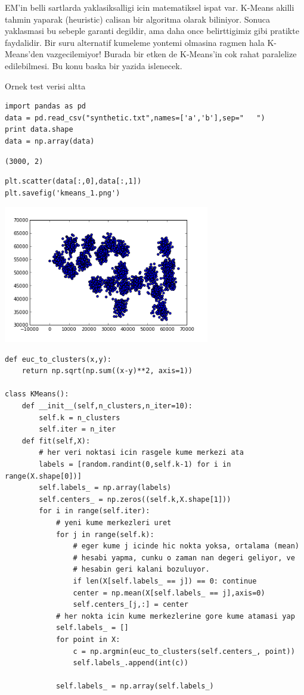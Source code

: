 \documentclass[12pt,fleqn]{article}\usepackage{../common}
\begin{document}
EM'in belli sartlarda yaklasiksalligi icin matematiksel ispat
var. K-Means akilli tahmin yaparak (heuristic) calisan bir algoritma
olarak biliniyor. Sonuca yaklasmasi bu sebeple garanti degildir, ama
daha once belirttigimiz gibi pratikte faydalidir. Bir suru alternatif
kumeleme yontemi olmasina ragmen hala K-Means'den vazgecilemiyor!
Burada bir etken de K-Means'in cok rahat paralelize edilebilmesi. Bu
konu baska bir yazida islenecek.

Ornek test verisi altta

\begin{verbatim}
import pandas as pd
data = pd.read_csv("synthetic.txt",names=['a','b'],sep="   ")
print data.shape
data = np.array(data)
\end{verbatim}

\begin{verbatim}
(3000, 2)
\end{verbatim}

\begin{verbatim}
plt.scatter(data[:,0],data[:,1])
plt.savefig('kmeans_1.png')
\end{verbatim}

\includegraphics[height=6cm]{kmeans_1.png}
\begin{verbatim}
def euc_to_clusters(x,y):
    return np.sqrt(np.sum((x-y)**2, axis=1))

class KMeans():
    def __init__(self,n_clusters,n_iter=10):
        self.k = n_clusters
        self.iter = n_iter
    def fit(self,X):
        # her veri noktasi icin rasgele kume merkezi ata
        labels = [random.randint(0,self.k-1) for i in range(X.shape[0])]
        self.labels_ = np.array(labels)
        self.centers_ = np.zeros((self.k,X.shape[1]))
        for i in range(self.iter):
            # yeni kume merkezleri uret
            for j in range(self.k):
                # eger kume j icinde hic nokta yoksa, ortalama (mean)
                # hesabi yapma, cunku o zaman nan degeri geliyor, ve
                # hesabin geri kalani bozuluyor.
                if len(X[self.labels_ == j]) == 0: continue
                center = np.mean(X[self.labels_ == j],axis=0)
                self.centers_[j,:] = center
            # her nokta icin kume merkezlerine gore kume atamasi yap
            self.labels_ = []
            for point in X:
                c = np.argmin(euc_to_clusters(self.centers_, point))
                self.labels_.append(int(c))

            self.labels_ = np.array(self.labels_)
\end{verbatim}
\end{document}
